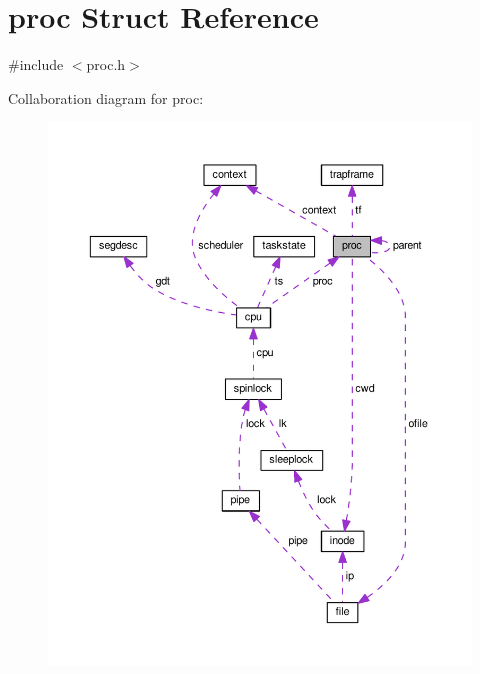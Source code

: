 \hypertarget{structproc}{}\section{proc Struct Reference}
\label{structproc}


{\ttfamily \#include $<$proc.\+h$>$}



Collaboration diagram for proc\+:\nopagebreak
\begin{figure}[H]
\begin{center}
\leavevmode
\includegraphics[width=350pt]{d6/d98/structproc__coll__graph}
\end{center}
\end{figure}

